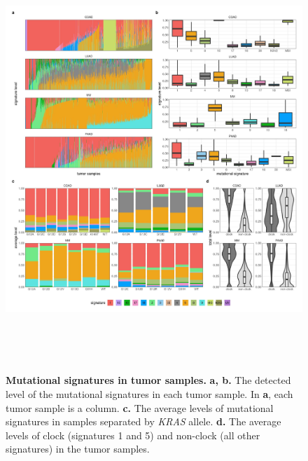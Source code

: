 \documentclass[english, 10pt, letterpaper]{article}
\newcommand{\KRAS}{\emph{KRAS}}
\begin{document}
\begin{figure}[p]
\centering
\includegraphics[height=160mm]{figures/Supp_Fig_2.jpeg}
\caption{
    \textbf{Mutational signatures in tumor samples.}
    \textbf{a, b.} The detected level of the mutational signatures in each tumor sample. In \textbf{a}, each tumor sample is a column.
    \textbf{c.} The average levels of mutational signatures in samples separated by \KRAS{} allele.
    \textbf{d.} The average levels of clock (signatures 1 and 5) and non-clock (all other signatures) in the tumor samples.
}
\label{sfig:mutational-signatures-summary}
\end{figure}
\end{document}
